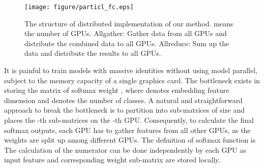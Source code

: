 \documentclass[letterpaper]{article} \usepackage{style/aaai21}  \usepackage{times}  \usepackage{helvet} \usepackage{courier}  \usepackage[hyphens]{url}  \usepackage{graphicx} \usepackage{color}
\begin{document}
\begin{figure*}[t]
	\centering
	\texttt{[image: figure/particl\_fc.eps]} \caption{The structure of  distributed implementation of our method.   means the number of GPUs. Allgather: Gather data from all GPUs and distribute the combined data to all GPUs. Allreduce: Sum up the data and distribute the results to all GPUs.}
	\label{fig2}
\end{figure*}
It is painful to train models with massive identities without using model parallel, subject to the memory capacity of a single graphics card. The bottleneck exists in storing the matrix of softmax weight  , where  denotes embedding feature dimension and  denotes the number of classes. A natural and straightforward approach to break the bottleneck is to partition  into  sub-matrices  of size   and places the -th sub-matrices on the -th GPU. Consequently, to calculate the final softmax outputs, each GPU has to gather features from all other GPUs, as the weights are split up among different GPUs. The definition of softmax function is 
The calculation of the numerator can be done independently by each GPU as input feature  and corresponding weight sub-matrix  are stored locally.
\end{document}
